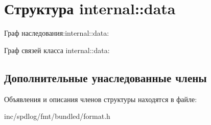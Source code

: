 \hypertarget{structinternal_1_1data}{}\section{Структура internal\+:\+:data}
\label{structinternal_1_1data}


Граф наследования\+:internal\+:\+:data\+:


Граф связей класса internal\+:\+:data\+:
\subsection*{Дополнительные унаследованные члены}


Объявления и описания членов структуры находятся в файле\+:\begin{DoxyCompactItemize}
\item 
inc/spdlog/fmt/bundled/format.\+h\end{DoxyCompactItemize}
